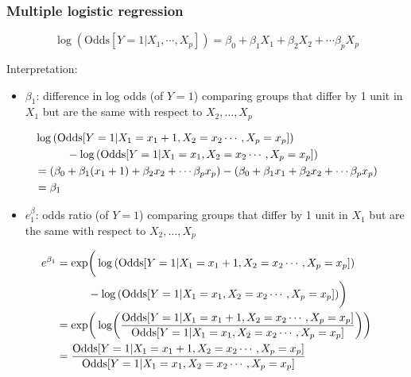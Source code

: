 \documentclass[10pt,t]{beamer}
\newcommand\tab[1][1cm]{\hspace*{#1}}
\begin{document}
\begin{frame}
	\frametitle{Multiple logistic regression}
	\vspace{-1.5cm}
	$$\log\left(\text{Odds}[Y =1 |X_1,\cdots,X_p]\right) = \beta_0 + \beta_1 X_1 + \beta_2X_2 + \cdots \beta_p X_p$$
	
	\color{blue} Interpretation: \color{black}
	\begin{itemize}   \color{red}
		\item $\beta_1$: \pause difference in log odds (of $Y=1$) comparing groups that differ by 1 unit in $X_1$ but are the same with respect to $X_2, \dots, X_p$ \pause
	\end{itemize}
	\vspace{-0.3cm}
	\begin{footnotesize}
		\begin{align*}
			&\log\left(\text{Odds}[Y =1 |X_1=x_1+1,X_2 = x_2\cdots,X_p=x_p]\right) \\
			&\tab - \log\left(\text{Odds}[Y =1 |X_1=x_1,X_2 = x_2\cdots,X_p=x_p]\right) \\
			& = (\beta_0 + \beta_1(x_1+1) + \beta_2x_2 + \cdots \beta_px_p) - (\beta_0 + \beta_1x_1 + \beta_2x_2 + \cdots \beta_px_p) \\
			& = \beta_1
		\end{align*}
	\end{footnotesize}\pause
	\vspace{-0.3cm}
	\begin{itemize}\color{red}
			\item $e^\beta_1$: \pause odds ratio (of $Y = 1$) comparing groups that differ by 1 unit in $X_1$ but are the same with respect to $X_2,\dots, X_p$ 
	\end{itemize}\pause
\vspace{-0.3cm}
\begin{footnotesize}
\begin{align*}
	e^{\beta_1} &=\exp\biggr(\log\left(\text{Odds}[Y =1 |X_1=x_1+1,X_2 = x_2\cdots,X_p=x_p]\right) \\
	&\tab - \log\left(\text{Odds}[Y =1 |X_1=x_1,X_2 = x_2\cdots,X_p=x_p]\right)\biggr) \\
	&= \exp\biggr(\log\biggr(\frac{\text{Odds}[Y =1 |X_1=x_1+1,X_2 = x_2\cdots,X_p=x_p]}{\text{Odds}[Y =1 |X_1=x_1,X_2 = x_2\cdots,X_p=x_p]}\biggr)\biggr)\\
	& = \frac{\text{Odds}[Y =1 |X_1=x_1+1,X_2 = x_2\cdots,X_p=x_p]}{\text{Odds}[Y =1 |X_1=x_1,X_2 = x_2\cdots,X_p=x_p]}
\end{align*}
\end{footnotesize}
\end{frame}
\end{document}
